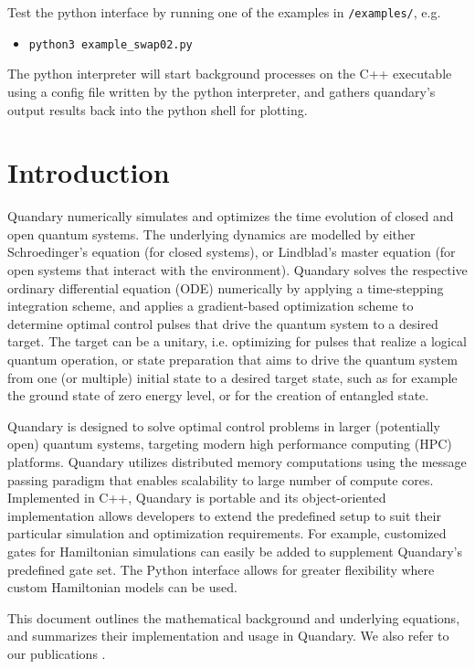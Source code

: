 \documentclass[11pt]{article}
\begin{document}
Test the python interface by running one of the examples in \texttt{/examples/}, e.g. 
\begin{itemize}
  \item[$>$]  \texttt{python3 example\_swap02.py}
\end{itemize}
 The python interpreter will start background processes on the C++ executable using a config file written by the python interpreter, and gathers quandary's output results back into the python shell for plotting.

\tableofcontents

\section{Introduction}
Quandary numerically simulates and optimizes the time evolution of closed and open quantum systems. The
underlying dynamics are modelled by either Schroedinger's equation (for closed systems), or Lindblad's master equation (for open systems that interact with the environment). Quandary solves the respective ordinary differential equation (ODE) numerically by applying a time-stepping integration scheme, and applies a gradient-based optimization
scheme to determine optimal control pulses that drive the quantum system to a desired target.
The target can be a unitary, i.e. optimizing for pulses that
realize a logical quantum operation, or state preparation that aims to drive the quantum system from one (or multiple) initial state to a desired target state, such as for example the ground state of zero energy level, or for the creation of entangled state. 

Quandary is designed to solve optimal control problems in larger (potentially open) quantum systems, targeting modern high performance computing (HPC) platforms. Quandary utilizes distributed memory computations using the message passing paradigm that enables scalability to large number of compute cores. Implemented in C++, Quandary is portable and its object-oriented implementation allows developers to extend the predefined setup to suit their particular simulation and optimization requirements. For example, customized gates for Hamiltonian simulations can easily be added to supplement Quandary’s predefined gate set. 
The Python interface allows for greater flexibility where custom Hamiltonian models can be used.

This document outlines the mathematical background and underlying equations, and summarizes their
implementation and usage in Quandary. We also refer to our publications \cite{guenther2021quandary, guenther2021quantum}.
\end{document}
